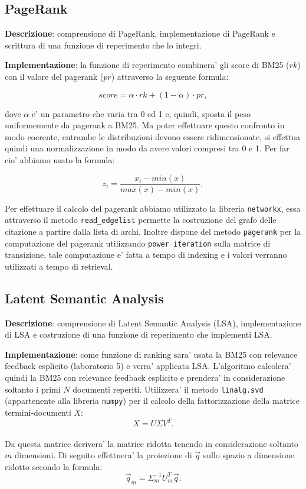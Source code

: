 \subsection{PageRank}
\label{sec:pagerank}

\textbf{Descrizione}: comprensione di PageRank, implementazione di PageRank e scrittura di una funzione di reperimento che lo integri.

\textbf{Implementazione}: la funzione di reperimento combinera' gli score di BM25 ($rk$) con il valore del pagerank ($pr$) attraverso la seguente formula:

\[ score =  \alpha \cdot rk + (1-\alpha) \cdot pr,\]

dove $\alpha$ e' un parametro che varia tra 0 ed 1 e, quindi, sposta il peso uniformemente da pagerank a BM25.
Ma poter effettuare questo confronto in modo coerente, entrambe le distribuzioni devono essere ridimensionate, si effettua quindi una normalizzazione in modo da avere valori compresi tra 0 e 1. Per far cio' abbiamo usato la formula:

\[ z_i = \frac{x_i - min(x)}{max(x) - min(x)}, \]

Per effettuare il calcolo del pagerank abbiamo utilizzato la libreria \texttt{networkx}, essa attraverso il metodo \texttt{read\_edgelist} permette la costruzione del grafo delle citazione a partire dalla lista 	di archi. Inoltre dispone del metodo \texttt{pagerank} per la computazione del pagerank utilizzando \texttt{power iteration} sulla matrice di transizione, tale computazione e' fatta a tempo di indexing e i valori verranno utilizzati a tempo di retrieval.

\subsection{Latent Semantic Analysis}
\label{sec:lsa}

\textbf{Descrizione}: comprensione di Latent Semantic Analysis (LSA), implementazione di LSA e costruzione di una funzione di reperimento che implementi LSA.

\textbf{Implementazione}: come funzione di ranking sara' usata la BM25 con relevance feedback esplicito (laboratorio 5) e verra' applicata LSA. 
L'algoritmo calcolera' quindi la BM25 con relevance feedback esplicito e prendera' in considerazione soltanto i primi $N$ documenti reperiti. Utilizzera' il metodo \texttt{linalg.svd} (appartenente alla libreria \texttt{numpy}) per il calcolo della fattorizzazione della matrice termini-documenti $X$: 
\[ X = U \Sigma V^{T}. \]\\
Da questa matrice derivera' la matrice ridotta tenendo in considerazione soltanto $m$ dimensioni. Di seguito effettuera' la proiezione di $\vec{q}$ sullo spazio a dimensione ridotto secondo la formula: 
\[ \vec{q}_m = \Sigma^{-1}_m U^{T}_m \vec{q}. \]

